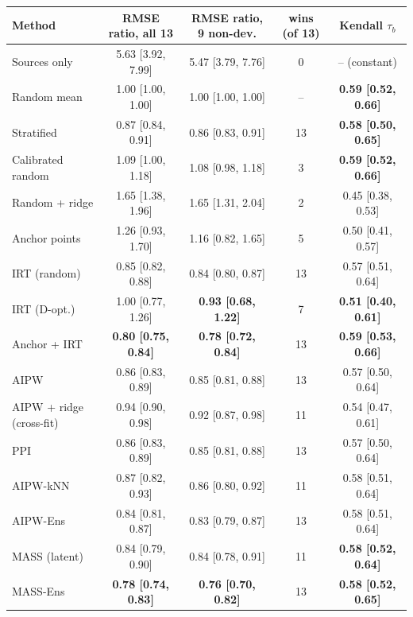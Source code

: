 \begin{tabular}{lcccc}
\toprule
Method & RMSE ratio, all 13 & RMSE ratio, 9 non-dev. & wins (of 13) & Kendall $\tau_b$ \\
\midrule
Sources only & 5.63 [3.92, 7.99] & 5.47 [3.79, 7.76] & 0 & -- (constant) \\
Random mean & 1.00 [1.00, 1.00] & 1.00 [1.00, 1.00] & -- & \textbf{0.59 [0.52, 0.66]} \\
Stratified & 0.87 [0.84, 0.91] & 0.86 [0.83, 0.91] & 13 & \textbf{0.58 [0.50, 0.65]} \\
Calibrated random & 1.09 [1.00, 1.18] & 1.08 [0.98, 1.18] & 3 & \textbf{0.59 [0.52, 0.66]} \\
Random + ridge & 1.65 [1.38, 1.96] & 1.65 [1.31, 2.04] & 2 & 0.45 [0.38, 0.53] \\
Anchor points & 1.26 [0.93, 1.70] & 1.16 [0.82, 1.65] & 5 & 0.50 [0.41, 0.57] \\
IRT (random) & 0.85 [0.82, 0.88] & 0.84 [0.80, 0.87] & 13 & 0.57 [0.51, 0.64] \\
IRT (D-opt.) & 1.00 [0.77, 1.26] & \textbf{0.93 [0.68, 1.22]} & 7 & \textbf{0.51 [0.40, 0.61]} \\
Anchor + IRT & \textbf{0.80 [0.75, 0.84]} & \textbf{0.78 [0.72, 0.84]} & 13 & \textbf{0.59 [0.53, 0.66]} \\
AIPW & 0.86 [0.83, 0.89] & 0.85 [0.81, 0.88] & 13 & 0.57 [0.50, 0.64] \\
AIPW + ridge (cross-fit) & 0.94 [0.90, 0.98] & 0.92 [0.87, 0.98] & 11 & 0.54 [0.47, 0.61] \\
PPI & 0.86 [0.83, 0.89] & 0.85 [0.81, 0.88] & 13 & 0.57 [0.50, 0.64] \\
AIPW-kNN & 0.87 [0.82, 0.93] & 0.86 [0.80, 0.92] & 11 & 0.58 [0.51, 0.64] \\
AIPW-Ens & 0.84 [0.81, 0.87] & 0.83 [0.79, 0.87] & 13 & 0.58 [0.51, 0.64] \\
MASS (latent) & 0.84 [0.79, 0.90] & 0.84 [0.78, 0.91] & 11 & \textbf{0.58 [0.52, 0.64]} \\
MASS-Ens & \textbf{0.78 [0.74, 0.83]} & \textbf{0.76 [0.70, 0.82]} & 13 & \textbf{0.58 [0.52, 0.65]} \\
\bottomrule
\end{tabular}
